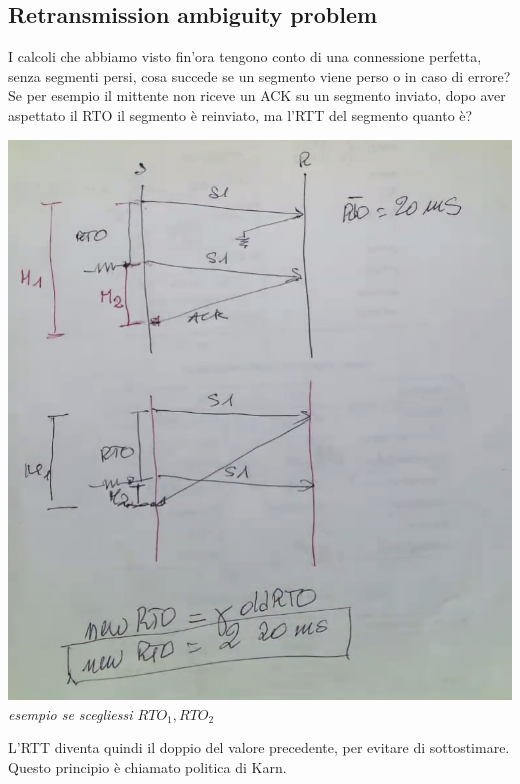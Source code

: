 \documentclass[11pt, oneside]{article}   	%
\begin{document}
\subsection*{Retransmission ambiguity problem}
I calcoli che abbiamo visto fin'ora tengono conto di una connessione perfetta, senza segmenti persi, cosa succede se un segmento viene perso o in caso di errore? Se per esempio il mittente non riceve un ACK su un segmento inviato, dopo aver aspettato il RTO il segmento è reinviato, ma l'RTT del segmento quanto è?
\begin{center}
\includegraphics[scale=0.5]{rtt}\\
\emph{esempio se scegliessi $RTO_1,  RTO_2$}
\end{center}
L'RTT diventa quindi il doppio del valore precedente, per evitare di sottostimare. Questo principio è chiamato politica di Karn.
\end{document}
